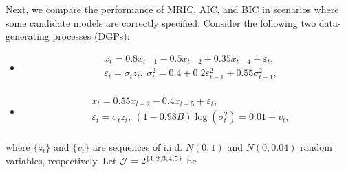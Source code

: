 \documentclass[ejsv2]{imsart}
\theoremstyle{plain}
\theoremstyle{definition}
\theoremstyle{remark}
\begin{document}

Next, we compare the performance of MRIC, AIC, and BIC in scenarios where some candidate models are correctly specified. 
Consider
the following two data-generating processes (DGPs):
\begin{itemize}
  \item [(I)]
  \begin{equation*}
\begin{split}
     & x_t=0.8x_{t-1}-0.5x_{t-2}+0.35x_{t-4}+\varepsilon_t, \\
     & \varepsilon_t=\sigma_tz_t,\ \sigma_t^2=0.4+0.2\varepsilon_{t-1}^2+0.55\sigma_{t-1}^2,  \\
\end{split}
\end{equation*}
  \item [(II)]
  \begin{equation*}
\begin{split}
     & x_t=0.55x_{t-2}-0.4x_{t-5}+\varepsilon_t, \\
     & \varepsilon_t=\sigma_tz_t,\ (1-0.98B)\log(\sigma_t^2)=0.01+v_t,  \\
\end{split}
\end{equation*}
\end{itemize}
where $\{z_t\}$ and $\{v_t\}$ are sequences of i.i.d. $N(0,1)$ and $N(0,0.04)$ random variables, respectively.
Let ${\cal J}=2^{\{1,2,3,4,5\}}$ be 
\end{document}
